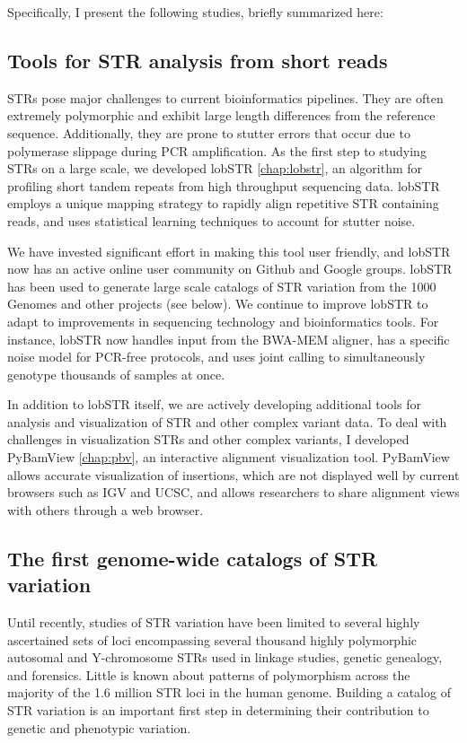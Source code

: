 Specifically, I present the following studies, briefly summarized here:

\subsection{Tools for STR analysis from short reads}
STRs pose major challenges to current bioinformatics pipelines. They are often extremely polymorphic and exhibit large length differences from the reference sequence. Additionally, they are prone to stutter errors that occur due to polymerase slippage during PCR amplification. As the first step to studying STRs on a large scale, we developed lobSTR \cite{GymrekGolanRossetEtAl2012} \autoref{chap:lobstr}, an algorithm for profiling short tandem repeats from high throughput sequencing data. lobSTR employs a unique mapping strategy to rapidly align repetitive STR containing reads, and uses statistical learning techniques to account for stutter noise.

We have invested significant effort in making this tool user friendly, and lobSTR now has an active online user community on Github and Google groups. lobSTR has been used to generate large scale catalogs of STR variation from the 1000 Genomes and other projects (see below). We continue to improve lobSTR to adapt to improvements in sequencing technology and bioinformatics tools. For instance, lobSTR now handles input from the BWA-MEM aligner, has a specific noise model for PCR-free protocols, and uses joint calling to simultaneously genotype thousands of samples at once.

In addition to lobSTR itself, we are actively developing additional tools for analysis and visualization of STR and other complex variant data. To deal with challenges in visualization STRs and other complex variants, I developed PyBamView \cite{Gymrek2014} \autoref{chap:pbv}, an interactive alignment visualization tool. PyBamView allows accurate visualization of insertions, which are not displayed well by current browsers such as IGV and UCSC, and allows researchers to share alignment views with others through a web browser.

\subsection{The first genome-wide catalogs of STR variation}
Until recently, studies of STR variation have been limited to several highly ascertained sets of loci encompassing several thousand highly polymorphic autosomal and Y-chromosome STRs used in linkage studies, genetic genealogy, and forensics. Little is known about patterns of polymorphism across the majority of the 1.6 million STR loci in the human genome. Building a catalog of STR variation is an important first step in determining their contribution to genetic and phenotypic variation.

